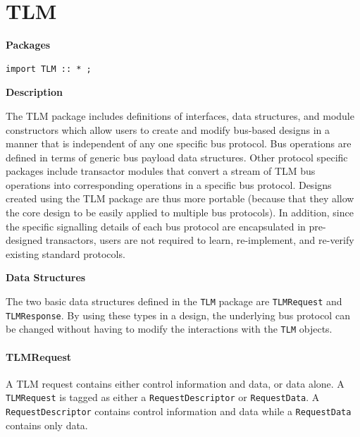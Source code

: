 \documentclass[twoside,letterpaper]{article}
\newcommand{\te}[1]{\texttt{#1}}
\begin{document}
\section{TLM}
\label{sec-TLM}

{\bf Packages}

\begin{verbatim}
import TLM :: * ;
\end{verbatim}




{\bf Description}
 
The TLM package includes definitions of interfaces, data structures,
and module constructors which allow users to create and modify
bus-based designs in a manner that is independent of any one specific
bus protocol. Bus operations are defined in terms of generic bus
payload data structures. Other protocol specific packages include
transactor modules that convert a stream of TLM bus operations into
corresponding operations in a specific bus protocol. Designs created
using the TLM package are thus more portable (because that they allow
the core design to be easily applied to multiple bus protocols). In
addition, since the specific signalling details of each bus protocol
are encapsulated in pre-designed transactors, users are not required
to learn, re-implement, and re-verify existing standard protocols.

%


{\bf Data Structures}
\label{TLM-data}
 
The two basic data structures defined in the \te{TLM} package are
\te{TLMRequest} and \te{TLMResponse}.  By using these
types in a design, the underlying bus protocol
can be changed without having to modify the interactions with the
\te{TLM} objects.


\paragraph{\bf TLMRequest}



A TLM request contains either control information and data, or data
alone.  A \te{TLMRequest} is tagged as either a  \te{RequestDescriptor} or
\te{RequestData}.   A \te{RequestDescriptor} contains
control information and data while a \te{RequestData} 
contains only  data.
\end{document}
